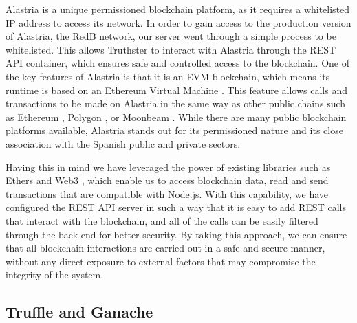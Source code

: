 \documentclass[target=mst,aauheader=]{thud}
\begin{document}
Alastria is a unique permissioned blockchain platform, as it requires a whitelisted IP address to access its network. In order to gain access to the production version of Alastria, the RedB network, our server went through a simple process to be whitelisted. This allows Truthster to interact with Alastria through the REST API container, which ensures safe and controlled access to the blockchain.
One of the key features of Alastria is that it is an EVM blockchain, which means its runtime is based on an Ethereum Virtual Machine \cite{evm}. This feature allows calls and transactions to be made on Alastria in the same way as other public chains such as Ethereum \cite{ethereum}, Polygon \cite{polygon}, or Moonbeam \cite{moonbeam}. While there are many public blockchain platforms available, Alastria stands out for its permissioned nature and its close association with the Spanish public and private sectors.\par
Having this in mind we have leveraged the power of existing libraries such as Ethers \cite{ethers} and Web3 \cite{web3}, which enable us to access blockchain data, read and send transactions that are compatible with Node.js. With this capability, we have configured the REST API server in such a way that it is easy to add REST calls that interact with the blockchain, and all of the calls can be easily filtered through the back-end for better security. By taking this approach, we can ensure that all blockchain interactions are carried out in a safe and secure manner, without any direct exposure to external factors that may compromise the integrity of the system.

\subsection{Truffle and Ganache}
\end{document}

